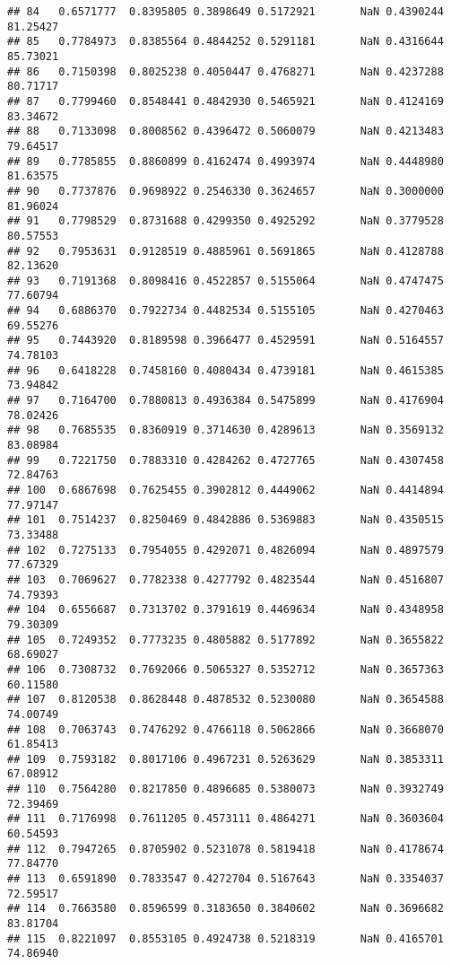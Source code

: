 \documentclass[]{article}
\begin{document}
\begin{verbatim}
## 84   0.6571777  0.8395805 0.3898649 0.5172921       NaN 0.4390244     81.25427
## 85   0.7784973  0.8385564 0.4844252 0.5291181       NaN 0.4316644     85.73021
## 86   0.7150398  0.8025238 0.4050447 0.4768271       NaN 0.4237288     80.71717
## 87   0.7799460  0.8548441 0.4842930 0.5465921       NaN 0.4124169     83.34672
## 88   0.7133098  0.8008562 0.4396472 0.5060079       NaN 0.4213483     79.64517
## 89   0.7785855  0.8860899 0.4162474 0.4993974       NaN 0.4448980     81.63575
## 90   0.7737876  0.9698922 0.2546330 0.3624657       NaN 0.3000000     81.96024
## 91   0.7798529  0.8731688 0.4299350 0.4925292       NaN 0.3779528     80.57553
## 92   0.7953631  0.9128519 0.4885961 0.5691865       NaN 0.4128788     82.13620
## 93   0.7191368  0.8098416 0.4522857 0.5155064       NaN 0.4747475     77.60794
## 94   0.6886370  0.7922734 0.4482534 0.5155105       NaN 0.4270463     69.55276
## 95   0.7443920  0.8189598 0.3966477 0.4529591       NaN 0.5164557     74.78103
## 96   0.6418228  0.7458160 0.4080434 0.4739181       NaN 0.4615385     73.94842
## 97   0.7164700  0.7880813 0.4936384 0.5475899       NaN 0.4176904     78.02426
## 98   0.7685535  0.8360919 0.3714630 0.4289613       NaN 0.3569132     83.08984
## 99   0.7221750  0.7883310 0.4284262 0.4727765       NaN 0.4307458     72.84763
## 100  0.6867698  0.7625455 0.3902812 0.4449062       NaN 0.4414894     77.97147
## 101  0.7514237  0.8250469 0.4842886 0.5369883       NaN 0.4350515     73.33488
## 102  0.7275133  0.7954055 0.4292071 0.4826094       NaN 0.4897579     77.67329
## 103  0.7069627  0.7782338 0.4277792 0.4823544       NaN 0.4516807     74.79393
## 104  0.6556687  0.7313702 0.3791619 0.4469634       NaN 0.4348958     79.30309
## 105  0.7249352  0.7773235 0.4805882 0.5177892       NaN 0.3655822     68.69027
## 106  0.7308732  0.7692066 0.5065327 0.5352712       NaN 0.3657363     60.11580
## 107  0.8120538  0.8628448 0.4878532 0.5230080       NaN 0.3654588     74.00749
## 108  0.7063743  0.7476292 0.4766118 0.5062866       NaN 0.3668070     61.85413
## 109  0.7593182  0.8017106 0.4967231 0.5263629       NaN 0.3853311     67.08912
## 110  0.7564280  0.8217850 0.4896685 0.5380073       NaN 0.3932749     72.39469
## 111  0.7176998  0.7611205 0.4573111 0.4864271       NaN 0.3603604     60.54593
## 112  0.7947265  0.8705902 0.5231078 0.5819418       NaN 0.4178674     77.84770
## 113  0.6591890  0.7833547 0.4272704 0.5167643       NaN 0.3354037     72.59517
## 114  0.7663580  0.8596599 0.3183650 0.3840602       NaN 0.3696682     83.81704
## 115  0.8221097  0.8553105 0.4924738 0.5218319       NaN 0.4165701     74.86940

\end{verbatim}
\end{document}
